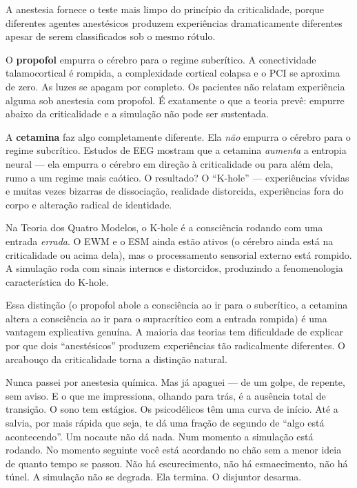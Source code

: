\documentclass[11pt, twoside, openright]{book}
\begin{document}
A anestesia fornece o teste mais limpo do princípio da criticalidade, porque diferentes agentes anestésicos produzem experiências dramaticamente diferentes apesar de serem classificados sob o mesmo rótulo.

O \textbf{propofol} empurra o cérebro para o regime subcrítico. A conectividade talamocortical é rompida, a complexidade cortical colapsa e o PCI se aproxima de zero. As luzes se apagam por completo. Os pacientes não relatam experiência alguma sob anestesia com propofol. É exatamente o que a teoria prevê: empurre abaixo da criticalidade e a simulação não pode ser sustentada.

A \textbf{cetamina} faz algo completamente diferente. Ela \textit{não} empurra o cérebro para o regime subcrítico. Estudos de EEG mostram que a cetamina \textit{aumenta} a entropia neural --- ela empurra o cérebro em direção à criticalidade ou para além dela, rumo a um regime mais caótico. O resultado? O ``K-hole'' --- experiências vívidas e muitas vezes bizarras de dissociação, realidade distorcida, experiências fora do corpo e alteração radical de identidade.

Na Teoria dos Quatro Modelos, o K-hole é a consciência rodando com uma entrada \textit{errada}. O EWM e o ESM ainda estão ativos (o cérebro ainda está na criticalidade ou acima dela), mas o processamento sensorial externo está rompido. A simulação roda com sinais internos e distorcidos, produzindo a fenomenologia característica do K-hole.

Essa distinção (o propofol abole a consciência ao ir para o subcrítico, a cetamina altera a consciência ao ir para o supracrítico com a entrada rompida) é uma vantagem explicativa genuína. A maioria das teorias tem dificuldade de explicar por que dois ``anestésicos'' produzem experiências tão radicalmente diferentes. O arcabouço da criticalidade torna a distinção natural.

Nunca passei por anestesia química. Mas já apaguei --- de um golpe, de repente, sem aviso. E o que me impressiona, olhando para trás, é a ausência total de transição. O sono tem estágios. Os psicodélicos têm uma curva de início. Até a salvia, por mais rápida que seja, te dá uma fração de segundo de ``algo está acontecendo''. Um nocaute não dá nada. Num momento a simulação está rodando. No momento seguinte você está acordando no chão sem a menor ideia de quanto tempo se passou. Não há escurecimento, não há esmaecimento, não há túnel. A simulação não se degrada. Ela termina. O disjuntor desarma.
\end{document}
